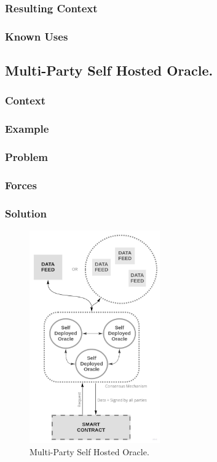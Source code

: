 \subsubsection{Resulting Context}
\subsubsection{Known Uses}

\subsection{Multi-Party Self Hosted Oracle.}

\subsubsection{Context}
\subsubsection{Example}
\subsubsection{Problem}
\subsubsection{Forces}
\subsubsection{Solution}

\begin{figure}[t]
  \begin{center}
    \leavevmode
    \includegraphics[width=0.5\textwidth]{figures/oraclearch4.jpg}
    \caption{Multi-Party Self Hosted Oracle.}
    \label{fig:/figures/paper-screening}
  \end{center}
\end{figure}

